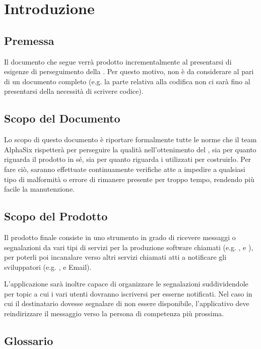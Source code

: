 \section{Introduzione}\label{Introduzione}

    \subsection{Premessa}
    Il documento che segue verrà prodotto incrementalmente al presentarsi di esigenze di perseguimento della .
    Per questo motivo, non è da considerare al pari di un documento completo (e.g. la parte relativa alla codifica non ci sarà fino
    al presentarsi della necessità di scrivere codice).

    \subsection{Scopo del Documento}
    Lo scopo di questo documento è riportare formalmente tutte le norme che il team AlphaSix rispetterà per perseguire
    la qualità nell'ottenimento del , sia per quanto riguarda il prodotto in s\'e, sia per quanto riguarda i 
    utilizzati per costruirlo. Per fare ciò, saranno effettuate continuamente verifiche atte a impedire a qualsiasi tipo di malformità o errore
    di rimanere presente per troppo tempo, rendendo più facile la manutenzione.

    \subsection{Scopo del Prodotto}
    Il prodotto finale consiste in uno strumento in grado di ricevere messaggi o segnalazioni da vari tipi di servizi per la produzione software chiamati  (e.g. ,  e ), per poterli poi incanalare verso altri servizi chiamati  atti a notificare gli sviluppatori (e.g. ,  e Email).
    
    L'applicazione sarà inoltre capace di organizzare le segnalazioni suddividendole per topic a cui i vari utenti dovranno iscriversi per esserne notificati. Nel caso in cui il destinatario dovesse segnalare di non essere disponibile, l'applicativo deve reindirizzare il messaggio verso la persona di competenza più prossima. 

    \subsection{Glossario}
    


